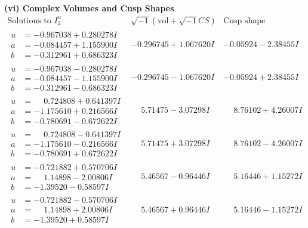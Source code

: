 \documentclass[1p]{elsarticle_modified}
\theoremstyle{definition}
\newcommand{\I}{\sqrt{-1}}
\begin{document}
\newpage\flushleft \textbf{(vi) Complex Volumes and Cusp Shapes}
$$\begin{array}{c|c|c}  
\text{Solutions to }I^u_{2}& \I (\text{vol} + \sqrt{-1}CS) & \text{Cusp shape}\\
 \hline 
\begin{aligned}
u &= -0.967038 + 0.280278 I \\
a &= -0.084457 + 1.155900 I \\
b &= -0.312961 + 0.686323 I\end{aligned}
 & -0.296745 + 1.067620 I & -0.05924 - 2.38455 I \\ \hline\begin{aligned}
u &= -0.967038 - 0.280278 I \\
a &= -0.084457 - 1.155900 I \\
b &= -0.312961 - 0.686323 I\end{aligned}
 & -0.296745 - 1.067620 I & -0.05924 + 2.38455 I \\ \hline\begin{aligned}
u &= \phantom{-}0.724808 + 0.641397 I \\
a &= -1.175610 + 0.216566 I \\
b &= -0.780691 - 0.672622 I\end{aligned}
 & \phantom{-}5.71475 - 3.07298 I & \phantom{-}8.76102 + 4.26007 I \\ \hline\begin{aligned}
u &= \phantom{-}0.724808 - 0.641397 I \\
a &= -1.175610 - 0.216566 I \\
b &= -0.780691 + 0.672622 I\end{aligned}
 & \phantom{-}5.71475 + 3.07298 I & \phantom{-}8.76102 - 4.26007 I \\ \hline\begin{aligned}
u &= -0.721882 + 0.570706 I \\
a &= \phantom{-}1.14898 - 2.00806 I \\
b &= -1.39520 - 0.58597 I\end{aligned}
 & \phantom{-}5.46567 - 0.96446 I & \phantom{-}5.16446 + 1.15272 I \\ \hline\begin{aligned}
u &= -0.721882 - 0.570706 I \\
a &= \phantom{-}1.14898 + 2.00806 I \\
b &= -1.39520 + 0.58597 I\end{aligned}
 & \phantom{-}5.46567 + 0.96446 I & \phantom{-}5.16446 - 1.15272 I \\ \hline\begin{aligned}

\end{aligned}
\end{array}$$
\end{document}
